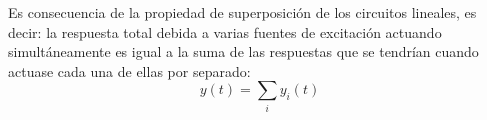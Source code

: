     
    
    Es consecuencia de la propiedad de superposición de los circuitos lineales, es decir: la respuesta total debida a varias fuentes de excitación actuando simultáneamente es igual a la suma de las respuestas que se tendrían cuando actuase cada una de ellas por separado:
    \begin{equation*}
        y(t) = \sum_i y_i(t)
    \end{equation*}
    
